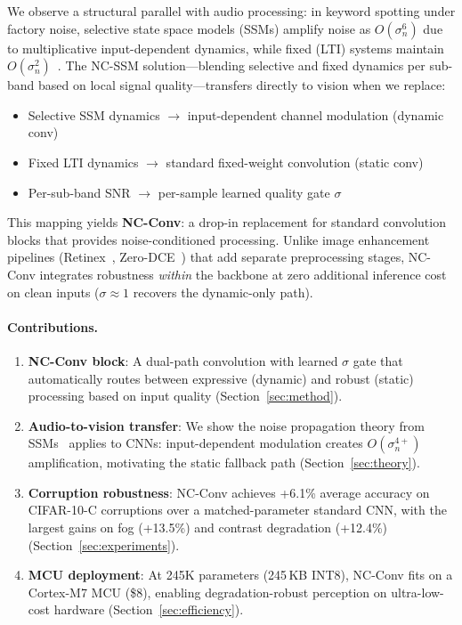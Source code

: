 \documentclass{bmvc2k}
\begin{document}
We observe a structural parallel with audio processing: in keyword spotting under factory noise, selective state space models (SSMs) amplify noise as $O(\sigma_n^6)$ due to multiplicative input-dependent dynamics, while fixed (LTI) systems maintain $O(\sigma_n^2)$~\cite{choi2026ncssm}.
The NC-SSM solution---blending selective and fixed dynamics per sub-band based on local signal quality---transfers directly to vision when we replace:
\begin{itemize}
\setlength\itemsep{0pt}
\item Selective SSM dynamics $\to$ input-dependent channel modulation (dynamic conv)
\item Fixed LTI dynamics $\to$ standard fixed-weight convolution (static conv)
\item Per-sub-band SNR $\to$ per-sample learned quality gate $\sigma$
\end{itemize}

This mapping yields \textbf{NC-Conv}: a drop-in replacement for standard convolution blocks that provides noise-conditioned processing.
Unlike image enhancement pipelines (Retinex~\cite{land1977retinex}, Zero-DCE~\cite{guo2020zerodce}) that add separate preprocessing stages, NC-Conv integrates robustness \emph{within} the backbone at zero additional inference cost on clean inputs ($\sigma \approx 1$ recovers the dynamic-only path).

\paragraph{Contributions.}
\begin{enumerate}
\setlength\itemsep{0pt}
\item \textbf{NC-Conv block}: A dual-path convolution with learned $\sigma$ gate that automatically routes between expressive (dynamic) and robust (static) processing based on input quality (Section~\ref{sec:method}).
\item \textbf{Audio-to-vision transfer}: We show the noise propagation theory from SSMs~\cite{choi2026ncssm} applies to CNNs: input-dependent modulation creates $O(\sigma_n^{4+})$ amplification, motivating the static fallback path (Section~\ref{sec:theory}).
\item \textbf{Corruption robustness}: NC-Conv achieves +6.1\% average accuracy on CIFAR-10-C corruptions over a matched-parameter standard CNN, with the largest gains on fog (+13.5\%) and contrast degradation (+12.4\%) (Section~\ref{sec:experiments}).
\item \textbf{MCU deployment}: At 245K parameters (245\,KB INT8), NC-Conv fits on a Cortex-M7 MCU (\$8), enabling degradation-robust perception on ultra-low-cost hardware (Section~\ref{sec:efficiency}).
\end{enumerate}
\end{document}
